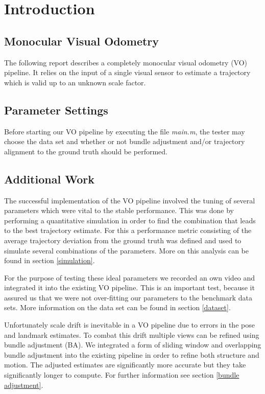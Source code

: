 \chapter{Introduction}
\vspace{-5mm}
\section{Monocular Visual Odometry}
The following report describes a completely monocular visual odometry (VO) pipeline. It relies on the input of a single visual sensor to estimate a trajectory which is valid up to an unknown scale factor.

\section{Parameter Settings}
\label{params}
Before starting our VO pipeline by executing the file \emph{main.m}, the tester may choose the data set and whether or not bundle adjustment and/or trajectory alignment to the ground truth should be performed.

\section{Additional Work}
The successful implementation of the VO pipeline involved the tuning of several parameters which were vital to the stable performance. This was done by performing a quantitative simulation in order to find the combination that leads to the best trajectory estimate. For this a performance metric consisting of the average trajectory deviation from the ground truth was defined and used to simulate several combinations of the parameters. More on this analysis can be found in section \ref{simulation}. \par
For the purpose of testing these ideal parameters we recorded an own video and integrated it into the existing VO pipeline. This is an important test, because it assured us that we were not over-fitting our parameters to the benchmark data sets. More information on the data set can be found in section \ref{dataset}. \par
Unfortunately scale drift is inevitable in a VO pipeline due to errors in the pose and landmark estimates. To combat this drift multiple views can be refined using bundle adjustment (BA). We integrated a form of sliding window and overlapping bundle adjustment into the existing pipeline in order to refine both structure and motion. The adjusted estimates are significantly more accurate but they take significantly longer to compute. For further information see section \ref{bundle adjustment}.
